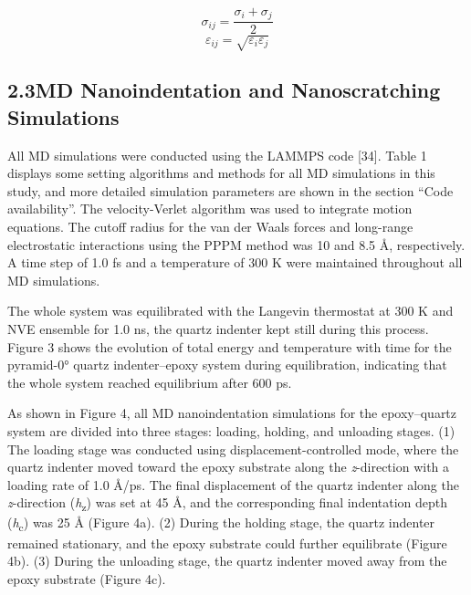 \documentclass{article}
\begin{document}
\begin{equation}
\sigma_{ij} = \frac{\sigma_i + \sigma_j}{2} \tag{1}
\end{equation}
\begin{equation}
\varepsilon_{ij} = \sqrt{\varepsilon_i \varepsilon_j} \tag{2}
\end{equation}

\subsection*{2.3\quad MD Nanoindentation and Nanoscratching Simulations}

All MD simulations were conducted using the LAMMPS code [34]. Table 1 displays some setting algorithms and methods for all MD simulations in this study, and more detailed simulation parameters are shown in the section “Code availability”. The velocity-Verlet algorithm was used to integrate motion equations. The cutoff radius for the van der Waals forces and long-range electrostatic interactions using the PPPM method was 10 and 8.5 Å, respectively. A time step of 1.0 fs and a temperature of 300 K were maintained throughout all MD simulations.

The whole system was equilibrated with the Langevin thermostat at 300 K and NVE ensemble for 1.0 ns, the quartz indenter kept still during this process. Figure 3 shows the evolution of total energy and temperature with time for the pyramid-0° quartz indenter–epoxy system during equilibration, indicating that the whole system reached equilibrium after 600 ps.

As shown in Figure 4, all MD nanoindentation simulations for the epoxy–quartz system are divided into three stages: loading, holding, and unloading stages. (1) The loading stage was conducted using displacement-controlled mode, where the quartz indenter moved toward the epoxy substrate along the \emph{z}-direction with a loading rate of 1.0 Å/ps. The final displacement of the quartz indenter along the \emph{z}-direction (\emph{h}\textsubscript{z}) was set at 45 Å, and the corresponding final indentation depth (\emph{h}\textsubscript{c}) was 25 Å (Figure 4a). (2) During the holding stage, the quartz indenter remained stationary, and the epoxy substrate could further equilibrate (Figure 4b). (3) During the unloading stage, the quartz indenter moved away from the epoxy substrate (Figure 4c).
\end{document}
